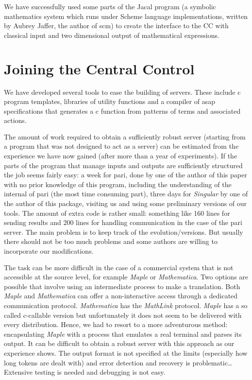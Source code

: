 \documentclass {article}
\begin{document}
We have successfully used some parts of the {\sc Jacal} program
(a symbolic mathematics system which runs under Scheme language
implementations, written by Aubrey Jaffer, the author of {\sc scm}) to
create the interface to the CC with classical input and two
dimensional output of mathematical expressions.

\section{ Joining the Central Control }

We have developed several tools to ease the building of servers. 
These include {\sc c} program templates, libraries of utility functions and a
compiler of  {\sc asap} specifications that generates a {\sc c} function from
patterns of terms and associated actions.

The amount of work required to obtain a
sufficiently robust server (starting from a program that was not designed to
act as a server) can be estimated from the experience we have now gained 
(after more than a year of experiments). 
If the parts of the program that manage inputs and outputs are sufficiently
structured the job seems fairly easy: a week for {\sc pari}, done by
one of the author of this paper with no prior knowledge of this program,
including the understanding of the internal of {\sc pari} (the most
time consuming part),  
three days for {\sl Singular} by one of the author of this package, visiting
us and  using some preliminary versions of our tools. The amount of extra
code is 
rather small: something like 160 lines for sending results and 200 lines for 
handling communication in the case of the {\sc pari} server.
The main problem is to keep track of the evolution/versions. But usually
there should not be too much problems and some authors are willing to
incorporate our modifications.

The task can be more difficult in the case of a commercial system that is not
accessible at the source level, for example {\sl Maple} or {\sl Mathematica}.
Two options are possible that involve using an intermediate process to make a
translation. Both {\sl Maple} and {\sl Mathematica} can offer a
non-interactive access through a dedicated communication protocol. 
{\sl Mathematica} has the {\sl MathLink} protocol.
{\sl Maple} has a so called {\sc c}-callable version but unfortunately it
does not seem to be delivered with every distribution. Hence, we had to
resort to a more adventurous method: encapsulating {\sl Maple} with a process
that emulates a real terminal and parses its output.
It can be difficult to obtain a robust server with this approach as our
experience shows. The output format is not specified at the limits
(especially how long tokens are dealt with) and error detection and
recovery is problematic\ldots Extensive testing is needed and debugging is
not easy.
\end{document}
